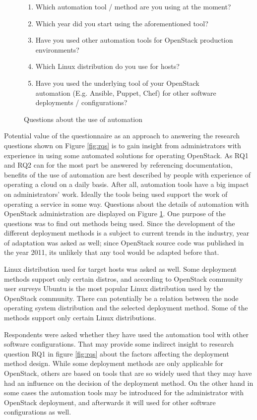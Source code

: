 \begin{figure}[t]
\centering
\begin{enumerate}
  \itemsep0em
  \item Which automation tool / method are you using at the moment?
  \item Which year did you start using the aforementioned tool?
  \item Have you used other automation tools for OpenStack production
        environments?
  \item Which Linux distribution do you use for hosts?
  \item Have you used the underlying tool of your OpenStack automation (E.g.
        Ansible, Puppet, Chef) for other software deployments / configurations?
\end{enumerate}
\caption{Questions about the use of automation}
\label{fig:questionnaire-tool-details}
\end{figure}

Potential value of the questionnaire as an approach to answering the research
questions shown on Figure \ref{fig:rqs} is to gain insight from administrators
with experience in using some automated solutions for operating OpenStack. As
RQ1 and RQ2 can for the most part be answered by referencing documentation,
benefits of the use of automation are best described by people with experience
of operating a cloud on a daily basis. After all, automation tools have a big
impact on administrators' work. Ideally the tools being used support the work
of operating a service in some way. Questions about the details of automation
with OpenStack administration are displayed on Figure
\ref{fig:questionnaire-tool-details}. One purpose of the questions was to find
out methods being used. Since the development of the different deployment
methods is a subject to current trends in the industry, year of adaptation was
asked as well; since OpenStack source code was published in the year 2011, its
unlikely that any tool would be adapted before that.

Linux distribution used for target hosts was asked as well. Some deployment
methods support only certain distros, and according to OpenStack community user
surveys \cite{openstack-user-survey-2018} Ubuntu is the most popular Linux
distribution used by the OpenStack community. There can potentially be a
relation between the node operating system distribution and the selected
deployment method. Some of the methods support only certain Linux
distributions.

Respondents were asked whether they have used the automation tool with other
software configurations. That may provide some indirect insight to research
question RQ1 in figure \ref{fig:rqs} about the factors affecting the deployment
method design. While some deployment methods are only applicable for OpenStack,
others are based on tools that are so widely used that they may have had an
influence on the decision of the deployment method. On the other hand in some
cases the automation tools may be introduced for the administrator with
OpenStack deployment, and afterwards it will used for other software
configurations as well.

